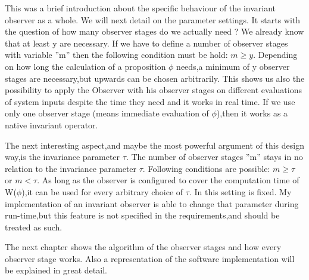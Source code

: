This was a brief introduction about the specific behaviour of the invariant observer as a whole. We will next detail on the parameter settings.
It starts with the question of how many observer stages do we actually need ? We already know that at least y are necessary.
If we have to define a number of observer stages with variable ''m'' then the following condition must be hold: $m \ge y$.
Depending on how long the calculation of a proposition $\phi$ needs,a minimum of y observer stages are necessary,but upwards 
can be chosen arbitrarily. This shows us also the possibility to apply the Observer with his observer stages
on different evaluations of system inputs despite the time they need and it works in real time.
If we use only one observer stage (means immediate evaluation of $\phi$),then it works as a native invariant operator.\newline

The next interesting aspect,and maybe the most powerful argument of this design way,is the invariance parameter $\tau$.
The number of observer stages ''m'' stays in no relation to the invariance parameter $\tau$. Following conditions are possible:
$m \ge \tau$ or $m < \tau$. As long as the observer is configured to cover the computation time of W($\phi$),it can be
used for every arbitrary choice of $\tau$. In \cite{RTFMBJ13} this setting is fixed.
My implementation of an invariant observer is able to change that parameter during run-time,but this feature is not 
specified in the requirements,and should be treated as such.\newline

The next chapter shows the algorithm of the observer stages and how every observer stage works. 
Also a representation of the software implementation will be explained in great detail.

